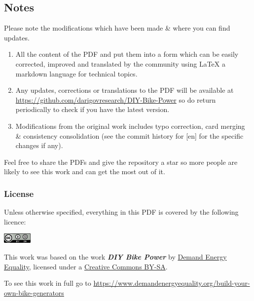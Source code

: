 \documentclass{article}
\theoremstyle{definition}
\theoremstyle{definition}
\theoremstyle{remark}
\begin{document}

  \subsection*{Notes} %
  \label{sub:notes}

    Please note the modifications which have been made \& where you can find updates.

    \begin{enumerate}
      \item All the content of the PDF and put them into a form which can be easily corrected, improved and translated by the community using LaTeX a markdown language for technical topics.
      \item Any updates, corrections or translations to the PDF will be available at \href{https://github.com/darigovresearch/DIY-Bike-Power}{https://github.com/darigovresearch/DIY-Bike-Power} so do return periodically to check if you have the latest version.
      \item Modifications from the original work includes typo correction, card merging \& consistency consolidation (see the commit history for [en] for the specific changes if any).
    \end{enumerate}

    Feel free to share the PDFs and give the repository a star so more people are likely to see this work and can get the most out of it.


  \subsubsection*{License} %
  \label{ssub:license}

    Unless otherwise specified, everything in this PDF is covered by the following licence:

    \includegraphics[]{../Images/image_0_2_(license).png} \newline

    This work was based on the work \textbf{\textit{DIY Bike Power}} by \href{https://www.demandenergyequality.org/}{Demand Energy Equality}, licensed under a \href{https://creativecommons.org/licenses/by-sa/4.0/legalcode}{Creative Commons BY-SA}.

    To see this work in full go to \href{https://www.demandenergyequality.org/build-your-own-bike-generators}{https://www.demandenergyequality.org/build-your-own-bike-generators}
  
\end{document}
